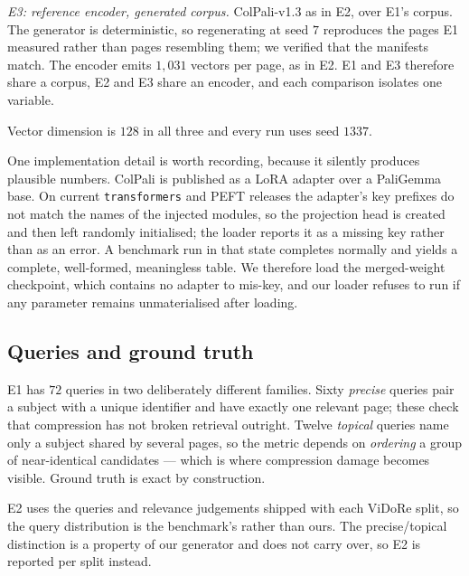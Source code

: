 \documentclass[conference]{IEEEtran}
\begin{document}
\emph{E3: reference encoder, generated corpus.} ColPali-v1.3 as in E2, over
E1's corpus. The generator is deterministic, so regenerating at seed $7$
reproduces the pages E1 measured rather than pages resembling them; we verified
that the manifests match. The encoder emits $1{,}031$ vectors per page, as in
E2. E1 and E3 therefore share a corpus, E2 and E3 share an encoder, and each
comparison isolates one variable.

Vector dimension is $128$ in all three and every run uses seed $1337$.

One implementation detail is worth recording, because it silently produces
plausible numbers. ColPali is published as a LoRA adapter over a PaliGemma base.
On current \texttt{transformers} and PEFT releases the adapter's key prefixes do
not match the names of the injected modules, so the projection head is created and
then left randomly initialised; the loader reports it as a missing key rather than
as an error. A benchmark run in that state completes normally and yields a
complete, well-formed, meaningless table. We therefore load the merged-weight
checkpoint, which contains no adapter to mis-key, and our loader refuses to run if
any parameter remains unmaterialised after loading.

\subsection{Queries and ground truth}
E1 has $72$ queries in two deliberately different families. Sixty
\emph{precise} queries pair a subject with a unique identifier and have exactly
one relevant page; these check that compression has not broken retrieval
outright. Twelve \emph{topical} queries name only a subject shared by several
pages, so the metric depends on \emph{ordering} a group of near-identical
candidates --- which is where compression damage becomes visible. Ground truth is
exact by construction.

E2 uses the queries and relevance judgements shipped with each ViDoRe split, so
the query distribution is the benchmark's rather than ours. The precise/topical
distinction is a property of our generator and does not carry over, so E2 is
reported per split instead.
\end{document}
